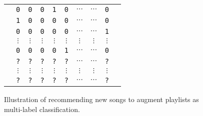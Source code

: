 \begin{figure}[!h]
\centering
\setlength{\tabcolsep}{1pt} %
\begin{tabular}{|*{10}{c}|} \hline
\rule{0em}{10pt}
& \texttt{0} & \texttt{0} & \texttt{0} & \texttt{1} & \texttt{0} & $\cdots$ & $\cdots$ & \texttt{0} & \\
& \texttt{1} & \texttt{0} & \texttt{0} & \texttt{0} & \texttt{0} & $\cdots$ & $\cdots$ & \texttt{0} & \\
\vspace{-5pt}
& \texttt{0} & \texttt{0} & \texttt{0} & \texttt{0} & \texttt{0} & $\cdots$ & $\cdots$ & \texttt{1} & \\
& $\vdots$ & $\vdots$ & $\vdots$ & $\vdots$ & $\vdots$ & $\vdots$ & $\vdots$ & $\vdots$ & \\
& \texttt{0} & \texttt{0} & \texttt{0} & \texttt{0} & \texttt{1} & $\cdots$ & $\cdots$ & \texttt{0} & \\ \hline
\rowcolor[gray]{0.9}
\vspace{-3pt}
& \texttt{?} & \texttt{?} & \texttt{?} & \texttt{?} & \texttt{?} & $\cdots$ & $\cdots$ & \texttt{?} & \rule{0em}{10pt} \\
\rowcolor[gray]{0.9}
& $\vdots$ & $\vdots$ & $\vdots$ & $\vdots$ & $\vdots$ & $\vdots$ & $\vdots$ & $\vdots$ &  \\
\rowcolor[gray]{0.9}
& \texttt{?} & \texttt{?} & \texttt{?} & \texttt{?} & \texttt{?} & $\cdots$ & $\cdots$ & \texttt{?} & \\ \hline
\end{tabular}
\caption{Illustration of recommending new songs to augment playlists as multi-label classification.}
\label{fig:mlr}
\end{figure}
